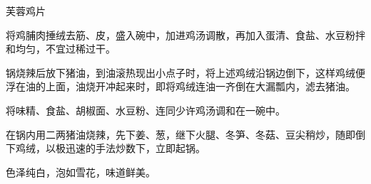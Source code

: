 \begin{recipe}{芙蓉鸡片}

\ingredients


\cooking

将鸡脯肉捶绒去筋、皮，盛入碗中，加进鸡汤调散，再加入蛋清、食盐、水豆粉拌和均匀，不宜过稀过干。

锅烧辣后放下猪油，到油滚热现出小点子时，将上述鸡绒沿锅边倒下，这样鸡绒便浮在油的上面，油烧开冲起来时，即将鸡绒连油一齐倒在大漏瓢内，滤去猪油。

将味精、食盐、胡椒面、水豆粉、连同少许鸡汤调和在一碗中。

在锅内用二两猪油烧辣，先下姜、葱，继下火腿、冬笋、冬菇、豆尖稍炒，随即倒下鸡绒，以极迅速的手法炒数下，立即起锅。

\notes

色泽纯白，泡如雪花，味道鲜美。

\end{recipe}

